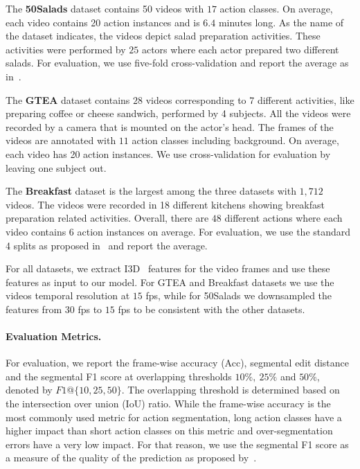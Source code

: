 \documentclass[10pt,twocolumn,letterpaper]{article}
\begin{document}
The \textbf{50Salads} dataset contains 50 videos with $17$ action classes. 
On average, each video contains 20 action instances and is $6.4$ minutes long. 
As the name of the dataset indicates, the videos depict salad preparation 
activities. These activities were performed by $25$ actors where each actor 
prepared two different salads. For evaluation, we use five-fold cross-validation 
and report the average as in~\cite{stein2013combining}. 

The \textbf{GTEA} dataset contains $28$ videos corresponding to 7 different 
activities, like preparing coffee or cheese sandwich, performed by 4 subjects. 
All the videos were recorded by a camera that is mounted on the actor's head. 
The frames of the videos are annotated with $11$ action classes including 
background. On average, each video has 20 action instances. We use cross-validation 
for evaluation by leaving one subject out. 

The \textbf{Breakfast} dataset is the largest among the three datasets with 
$1,712$ videos. The videos were recorded in 18 different kitchens showing 
breakfast preparation related activities. Overall, there are $48$ different 
actions where each video contains $6$ action instances on average. For evaluation, 
we use the standard 4 splits as proposed in~\cite{kuehne2014language} and report 
the average.

For all datasets, we extract I3D~\cite{carreira2017quo} features for the video  
frames and use these features as input to our model. For GTEA and Breakfast datasets
we use the videos temporal resolution at $15$ fps, while for 50Salads we downsampled 
the features from $30$ fps to $15$ fps to be consistent with the other datasets.

\paragraph{Evaluation Metrics.} For evaluation, we report the frame-wise 
accuracy (Acc), segmental edit distance and the segmental F1 score at overlapping 
thresholds $10\%,\ 25\%$ and $50\%$, denoted by $F1$@$\{10,25,50\}$. The overlapping 
threshold is determined based on the intersection over union (IoU) ratio. While the 
frame-wise accuracy is the most commonly used metric for action segmentation, long 
action classes have a higher impact than short action classes on this metric and 
over-segmentation errors have a very low impact. For that reason, we use the segmental 
F1 score as a measure of the quality of the prediction as proposed by~\cite{Lea_2017_CVPR}.
\end{document}

